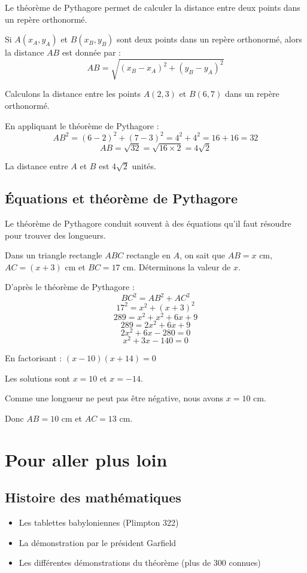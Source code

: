 Le théorème de Pythagore permet de calculer la distance entre deux points dans un repère orthonormé.

Si $A(x_A, y_A)$ et $B(x_B, y_B)$ sont deux points dans un repère orthonormé, alors la distance $AB$ est donnée par :
\[AB = \sqrt{(x_B - x_A)^2 + (y_B - y_A)^2}\]

\begin{exemple}
Calculons la distance entre les points $A(2, 3)$ et $B(6, 7)$ dans un repère orthonormé.

En appliquant le théorème de Pythagore :
\[AB^2 = (6-2)^2 + (7-3)^2 = 4^2 + 4^2 = 16 + 16 = 32\]
\[AB = \sqrt{32} = \sqrt{16 \times 2} = 4\sqrt{2}\]

La distance entre $A$ et $B$ est $4\sqrt{2}$ unités.
\end{exemple}

\subsection{Équations et théorème de Pythagore}

Le théorème de Pythagore conduit souvent à des équations qu'il faut résoudre pour trouver des longueurs.

\begin{exemple}
Dans un triangle rectangle $ABC$ rectangle en $A$, on sait que $AB = x$ cm, $AC = (x+3)$ cm et $BC = 17$ cm. Déterminons la valeur de $x$.

D'après le théorème de Pythagore :
\[BC^2 = AB^2 + AC^2\]
\[17^2 = x^2 + (x+3)^2\]
\[289 = x^2 + x^2 + 6x + 9\]
\[289 = 2x^2 + 6x + 9\]
\[2x^2 + 6x - 280 = 0\]
\[x^2 + 3x - 140 = 0\]

En factorisant : $(x - 10)(x + 14) = 0$

Les solutions sont $x = 10$ et $x = -14$.

Comme une longueur ne peut pas être négative, nous avons $x = 10$ cm.

Donc $AB = 10$ cm et $AC = 13$ cm.
\end{exemple}

\section{Pour aller plus loin}

\subsection{Histoire des mathématiques}
\begin{itemize}
    \item Les tablettes babyloniennes (Plimpton 322)
    \item La démonstration par le président Garfield
    \item Les différentes démonstrations du théorème (plus de 300 connues)
\end{itemize}

